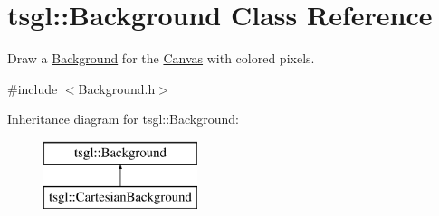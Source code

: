 \hypertarget{classtsgl_1_1_background}{}\section{tsgl\+:\+:Background Class Reference}
\label{classtsgl_1_1_background}


Draw a \hyperlink{classtsgl_1_1_background}{Background} for the \hyperlink{classtsgl_1_1_canvas}{Canvas} with colored pixels.  




{\ttfamily \#include $<$Background.\+h$>$}

Inheritance diagram for tsgl\+:\+:Background\+:\begin{figure}[H]
\begin{center}
\leavevmode
\includegraphics[height=2.000000cm]{classtsgl_1_1_background}
\end{center}
\end{figure}
